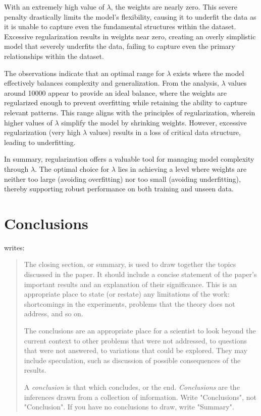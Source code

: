 \documentclass[a4paper,oneside,bibliography=totoc]{scrartcl}
\begin{document}
With an extremely high value of $\lambda$, the weights are nearly zero. This severe penalty drastically limits the model's flexibility, causing it to underfit the data as it is unable to capture even the fundamental structures within the dataset. Excessive regularization results in weights near zero, creating an overly simplistic model that severely underfits the data, failing to capture even the primary relationships within the dataset.

The observations indicate that an optimal range for $\lambda$ exists where the model effectively balances complexity and generalization. From the analysis, $\lambda$ values around 10000 appear to provide an ideal balance, where the weights are regularized enough to prevent overfitting while retaining the ability to capture relevant patterns. This range aligns with the principles of regularization, wherein higher values of $\lambda$ simplify the model by shrinking weights. However, excessive regularization (very high $\lambda$ values) results in a loss of critical data structure, leading to underfitting. 

In summary, regularization offers a valuable tool for managing model complexity through $\lambda$. The optimal choice for $\lambda$ lies in achieving a level where weights are neither too large (avoiding overfitting) nor too small (avoiding underfitting), thereby supporting robust performance on both training and unseen data.

\section{Conclusions}

\citet{zobel2004} writes:

\blockcquote{zobel2004}{%
  The closing section, or summary, is used to draw together the topics discussed
  in the paper. It should include a concise statement of the paper's important
  results and an explanation of their significance. This is an appropriate place
  to state (or restate) any limitations of the work: shortcomings in the
  experiments, problems that the theory does not address, and so on.

  The conclusions are an appropriate place for a scientist to look beyond the
  current context to other problems that were not addressed, to questions that
  were not answered, to variations that could be explored. They may include
  speculation, such as discussion of possible consequences of the results.

  A \emph{conclusion} is that which concludes, or the end. \emph{Conclusions}
  are the inferences drawn from a collection of information. Write
  "Conclusions", not "Conclusion". If you have no conclusions to draw, write
  "Summary".}
\end{document}
